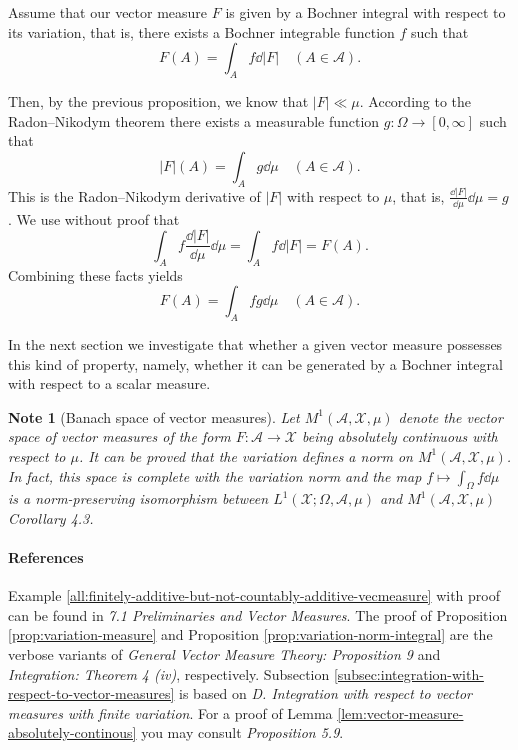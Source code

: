 \documentclass[a4paper, 12pt]{article}
\newtheorem{note}[lem]{Note}
\begin{document}
Assume that our vector measure $F$ is given by a Bochner integral with respect to its variation, that is, there exists a Bochner integrable function $f$ such that
$$F(A) = \int_{A} f \dd{|F|} \quad (A \in \mathcal{A}).$$

Then, by the previous proposition, we know that $|F| \ll \mu$. According to the Radon\---Nikodym theorem there exists a measurable function $g\colon \Omega \to [0, \infty]$ such that
$$|F|(A) = \int_{A} g \dd{\mu} \quad (A \in \mathcal{A}).$$
This is the Radon\---Nikodym derivative of $|F|$ with respect to $\mu$, that is,
$\frac{\dd{|F|}}{\dd{\mu}} \dd{\mu} = g$.
We use without proof that
$$\int_{A} f \frac{\dd{|F|}}{\dd{\mu}} \dd{\mu} = \int_{A} f \dd{|F|} = F(A).$$
Combining these facts yields %
$$F(A) = \int_{A} fg \dd{\mu} \quad (A \in \mathcal{A}).$$

In the next section we investigate that whether a given vector measure possesses this kind of property, namely, whether it can be generated by a Bochner integral with respect to a scalar measure.

\begin{note}[Banach space of vector measures]\normalfont
Let $M^1(\mathcal{A}, \mathcal{X}, \mu)$ denote the vector space of vector measures of the form $F\colon \mathcal{A} \to \mathcal{X}$ being absolutely continuous with respect to $\mu$. It can be proved that the variation defines a norm on $M^1(\mathcal{A}, \mathcal{X}, \mu)$. In fact, this space is complete with the variation norm and the map $f \mapsto \int_{\Omega} f \dd{\mu}$ is a norm-preserving isomorphism between $L^1(\mathcal{X}; \Omega, \mathcal{A}, \mu)$ and $M^1(\mathcal{A}, \mathcal{X}, \mu)$ \cite{lang} \textit{Corollary 4.3}.
\end{note}

\paragraph*{References}  Example \ref{all:finitely-additive-but-not-countably-additive-vecmeasure} with proof can be found in \cite{ferrando} \textit{7.1 Preliminaries and Vector Measures}. The proof of Proposition \ref{prop:variation-measure} and Proposition \ref{prop:variation-norm-integral} are the verbose variants of \cite{diestel-uhl} \textit{General Vector Measure Theory: Proposition 9} and \textit{Integration: Theorem 4 (iv)}, respectively. Subsection \ref{subsec:integration-with-respect-to-vector-measures} is based on \cite{dinculeanu} \textit{D.  Integration with respect to vector measures with finite variation}. For a proof of Lemma \ref{lem:vector-measure-absolutely-continous} you may consult \cite{ryan} \textit{Proposition 5.9}.
\end{document}
